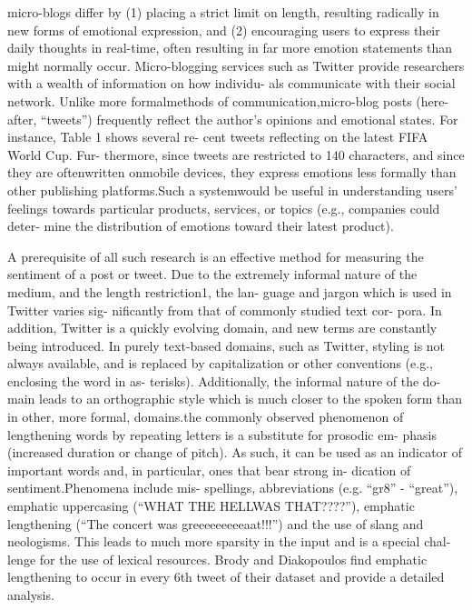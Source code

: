 \documentclass[twocolumn]{svjour3}          %
\begin{document}
micro-blogs differ by (1) placing a strict limit on length, resulting radically in new forms of emotional expression, and (2) encouraging users to express their daily thoughts in real-time, often resulting in far more emotion statements than might normally occur. Micro-blogging services such as Twitter provide researchers with a wealth of information on how individu- als communicate with their social network. Unlike more formalmethods of communication,micro-blog posts (here- after, “tweets”) frequently reflect the author’s opinions and emotional states. For instance, Table 1 shows several re- cent tweets reflecting on the latest FIFA World Cup. Fur- thermore, since tweets are restricted to 140 characters, and since they are oftenwritten onmobile devices, they express emotions less formally than other publishing platforms.Such a systemwould be useful in understanding users’ feelings towards particular products, services, or topics (e.g., companies could deter- mine the distribution of emotions toward their latest product).\cite{roberts2012empatweet}

A prerequisite of all such research is an effective method for measuring the sentiment of a post or tweet. Due to the extremely informal nature of the medium, and the length restriction1, the lan- guage and jargon which is used in Twitter varies sig- nificantly from that of commonly studied text cor- pora. In addition, Twitter is a quickly evolving domain, and new terms are constantly being introduced.
In purely text-based domains, such as Twitter, styling is not always available, and is replaced by capitalization or other conventions (e.g., enclosing the word in as- terisks). Additionally, the informal nature of the do- main leads to an orthographic style which is much closer to the spoken form than in other, more formal, domains.the commonly observed phenomenon of lengthening words by repeating letters is a substitute for prosodic em- phasis (increased duration or change of pitch). As such, it can be used as an indicator of important words and, in particular, ones that bear strong in- dication of sentiment.Phenomena include mis- spellings, abbreviations (e.g. “gr8” - “great”), emphatic uppercasing (“WHAT THE HELLWAS THAT????”), emphatic lengthening (“The concert was greeeeeeeeeaat!!!”) and the use of slang and neologisms. This leads to much more sparsity in the input and is a special chal- lenge for the use of lexical resources. Brody and Diakopoulos \cite{brody2011col} find emphatic lengthening to occur in every 6th tweet of their dataset and provide a detailed analysis.\cite{brody2011col}
\end{document}
